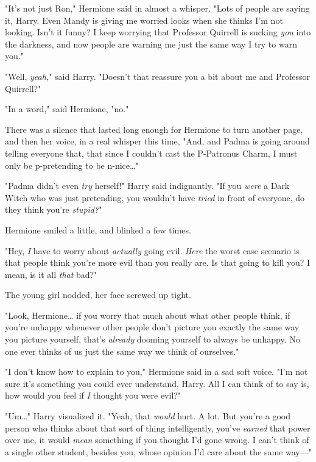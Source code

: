 "It's not just Ron," Hermione said in almost a whisper. "Lots of people are
saying it, Harry. Even Mandy is giving me worried looks when she thinks I'm not
looking. Isn't it funny? I keep worrying that Professor Quirrell is sucking
\emph{you} into the darkness, and now people are warning me just the same way I
try to warn you."

"Well, \emph{yeah,}" said Harry. "Doesn't that reassure you a bit about me and
Professor Quirrell?"

"In a word," said Hermione, "no."

There was a silence that lasted long enough for Hermione to turn another page,
and then her voice, in a real whisper this time, "And, and Padma is going
around telling everyone that, that since I couldn't cast the P-Patronus Charm,
I must only be p-pretending to be n-nice{\ldots}"

"Padma didn't even \emph{try} herself!" Harry said indignantly. "If you
\emph{were} a Dark Witch who was just pretending, you wouldn't have
\emph{tried} in front of everyone, do they think you're \emph{stupid?}"

Hermione smiled a little, and blinked a few times.

"Hey, \emph{I} have to worry about \emph{actually} going evil. \emph{Here} the
worst case scenario is that people think you're more evil than you really are.
Is that going to kill you? I mean, is it all \emph{that} bad?"

The young girl nodded, her face screwed up tight.

"Look, Hermione{\ldots} if you worry that much about what other people think,
if you're unhappy whenever other people don't picture you exactly the same way
you picture yourself, that's \emph{already} dooming yourself to always be
unhappy. No one ever thinks of us just the same way we think of ourselves."

"I don't know how to explain to you," Hermione said in a sad soft voice. "I'm
not sure it's something you could ever understand, Harry. All I can think of to
say is, how would you feel if \emph{I} thought you were evil?"

"Um{\ldots}" Harry visualized it. "Yeah, that \emph{would} hurt. A lot. But
you're a good person who thinks about that sort of thing intelligently, you've
\emph{earned} that power over me, it would \emph{mean} something if you thought
I'd gone wrong. I can't think of a single other student, besides you, whose
opinion I'd care about the same way---"

